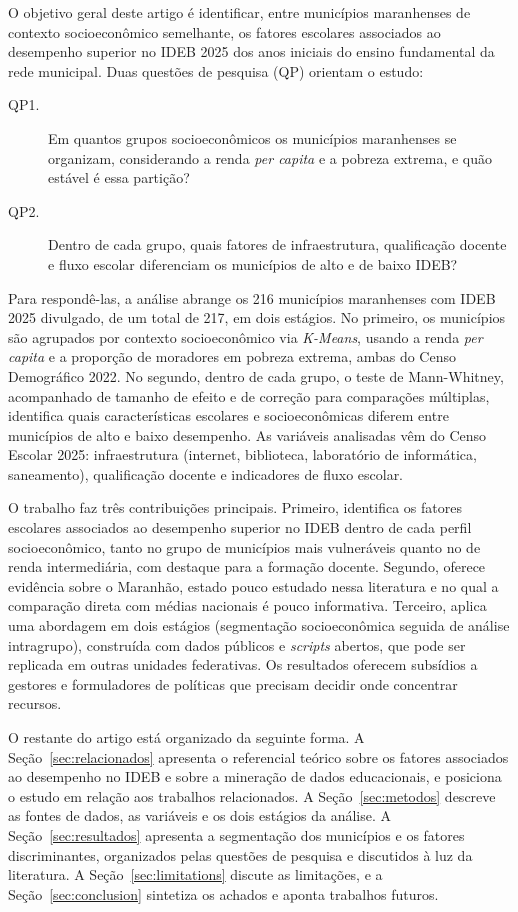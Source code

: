 O objetivo geral deste artigo é identificar, entre municípios maranhenses de contexto socioeconômico semelhante, os fatores escolares associados ao desempenho superior no IDEB 2025 dos anos iniciais do ensino fundamental da rede municipal. Duas questões de pesquisa (QP) orientam o estudo:

\begin{description}
    \item[QP1.] Em quantos grupos socioeconômicos os municípios maranhenses se organizam, considerando a renda \textit{per capita} e a pobreza extrema, e quão estável é essa partição?
    \item[QP2.] Dentro de cada grupo, quais fatores de infraestrutura, qualificação docente e fluxo escolar diferenciam os municípios de alto e de baixo IDEB?
\end{description}

Para respondê-las, a análise abrange os 216 municípios maranhenses com IDEB 2025 divulgado, de um total de 217, em dois estágios. No primeiro, os municípios são agrupados por contexto socioeconômico via \textit{K-Means}, usando a renda \textit{per capita} e a proporção de moradores em pobreza extrema, ambas do Censo Demográfico 2022. No segundo, dentro de cada grupo, o teste de Mann-Whitney, acompanhado de tamanho de efeito e de correção para comparações múltiplas, identifica quais características escolares e socioeconômicas diferem entre municípios de alto e baixo desempenho. As variáveis analisadas vêm do Censo Escolar 2025: infraestrutura (internet, biblioteca, laboratório de informática, saneamento), qualificação docente e indicadores de fluxo escolar.

O trabalho faz três contribuições principais. Primeiro, identifica os fatores escolares associados ao desempenho superior no IDEB dentro de cada perfil socioeconômico, tanto no grupo de municípios mais vulneráveis quanto no de renda intermediária, com destaque para a formação docente. Segundo, oferece evidência sobre o Maranhão, estado pouco estudado nessa literatura e no qual a comparação direta com médias nacionais é pouco informativa. Terceiro, aplica uma abordagem em dois estágios (segmentação socioeconômica seguida de análise intragrupo), construída com dados públicos e \textit{scripts} abertos, que pode ser replicada em outras unidades federativas. Os resultados oferecem subsídios a gestores e formuladores de políticas que precisam decidir onde concentrar recursos.

O restante do artigo está organizado da seguinte forma. A Seção~\ref{sec:relacionados} apresenta o referencial teórico sobre os fatores associados ao desempenho no IDEB e sobre a mineração de dados educacionais, e posiciona o estudo em relação aos trabalhos relacionados. A Seção~\ref{sec:metodos} descreve as fontes de dados, as variáveis e os dois estágios da análise. A Seção~\ref{sec:resultados} apresenta a segmentação dos municípios e os fatores discriminantes, organizados pelas questões de pesquisa e discutidos à luz da literatura. A Seção~\ref{sec:limitations} discute as limitações, e a Seção~\ref{sec:conclusion} sintetiza os achados e aponta trabalhos futuros.
